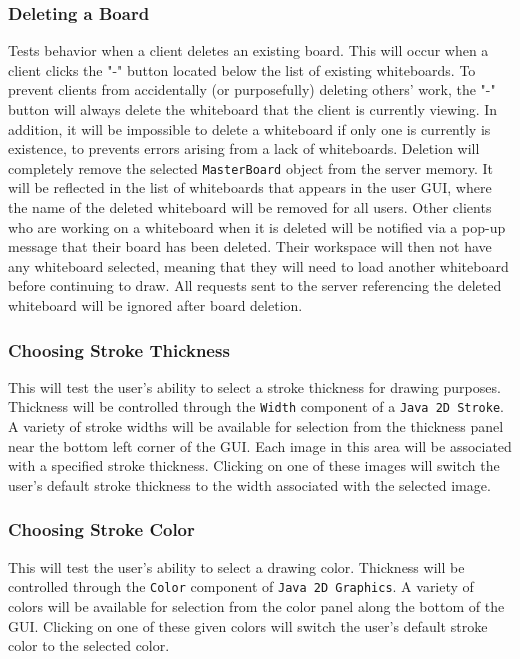 \subsubsection{Deleting a Board}
Tests behavior when a client deletes an existing board. This will occur when a client clicks the "-" button located below the list of existing whiteboards.  To prevent clients from accidentally (or purposefully) deleting others' work, the "-" button will always delete the whiteboard that the client is currently viewing. In addition, it will be impossible to delete a whiteboard if only one is currently is existence, to prevents errors arising from a lack of whiteboards.  Deletion will completely remove the selected \texttt{MasterBoard} object from the server memory. It will be reflected in the list of whiteboards that appears in the user GUI, where the name of the deleted whiteboard will be removed for all users. Other clients who are working on a whiteboard when it is deleted will be notified via a pop-up message that their board has been deleted.  Their workspace will then not have any whiteboard selected, meaning that they will need to load another whiteboard before continuing to draw.  All requests sent to the server referencing the deleted whiteboard will be ignored after board deletion.

\subsubsection{Choosing Stroke Thickness}
This will test the user's ability to select a stroke thickness for drawing purposes. Thickness will be controlled through the \texttt{Width} component of a \texttt{Java 2D Stroke}. A variety of stroke widths will be available for selection from the thickness panel near the bottom left corner of the GUI. Each image in this area will be associated with a specified stroke thickness. Clicking on one of these images will switch the user's default stroke thickness to the width associated with the selected image.

\subsubsection{Choosing Stroke Color}
This will test the user's ability to select a drawing color. Thickness will be controlled through the \texttt{Color} component of \texttt{Java 2D Graphics}. A variety of colors will be available for selection from the color panel along the bottom of the GUI. Clicking on one of these given colors will switch the user's default stroke color to the selected color.


